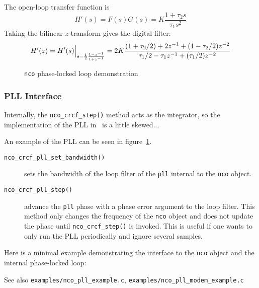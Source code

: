 The open-loop transfer function is
\[
    H'(s) = F(s)G(s) = K \frac{1 + \tau_2 s}{\tau_1 s^2}
\]
Taking the bilinear $z$-transform gives the digital filter:
\[
    H'(z) = H'(s)\Bigl.\Bigr|_{s = \frac{1}{2}\frac{1-z^{-1}}{1+z^{-1}}}
          = 2 K \frac{
                (1+\tau_2/2) + 2 z^{-1}     + ( 1 - \tau_2/2)z^{-2}
          } {
                \tau_1/2 -\tau_1 z^{-1} + (\tau_1/2)z^{-2}
          }
\]

\begin{figure}
\centering
{}
\caption{{\tt nco} phase-locked loop demonstration}
\label{fig:module:nco:pll}
\end{figure}

\subsubsection{PLL Interface}

Internally, the {\tt nco\_crcf\_step()} method acts as the integrator, so the
implementation of the PLL in \liquid\ is a little skewed...

An example of the PLL can be seen in figure~\ref{fig:module:nco:pll}.

\begin{description}
\item[{\tt nco\_crcf\_pll\_set\_bandwidth()}]
    sets the bandwidth of the loop filter of the {\tt pll} internal to the
    {\tt nco} object.
\item[{\tt nco\_crcf\_pll\_step()}]
    advance the {\tt pll} phase with a phase error argument to the loop
    filter.
    This method only changes the frequency of the {\tt nco} object and does
    not update the phase until {\tt nco\_crcf\_step()} is invoked.
    This is useful if one wants to only run the PLL periodically and ignore
    several samples.
\end{description}

Here is a minimal example demonstrating the interface to the {\tt nco} object
and the internal phase-locked loop:
%


See also
{\tt examples/nco\_pll\_example.c},
{\tt examples/nco\_pll\_modem\_example.c}

